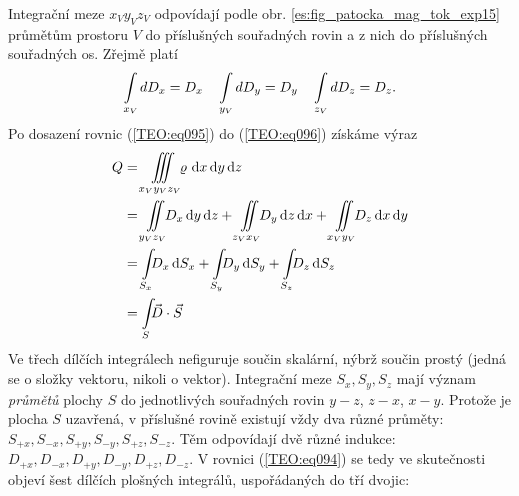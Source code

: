       Integrační meze \(x_Vy_Vz_V\) odpovídají podle obr. \ref{es:fig_patocka_mag_tok_exp15} 
      průmětům prostoru \(V\) do příslušných souřadných rovin a z nich do příslušných souřadných 
      os. Zřejmě platí
      \begin{equation}\label{TEO:eq095}
        \limitint_{\mathclap{x_V}}dD_x = D_x \quad
        \limitint_{\mathclap{y_V}}dD_y = D_y \quad
        \limitint_{\mathclap{z_V}}dD_z = D_z.
      \end{equation}
      Po dosazení rovnic (\ref{TEO:eq095}) do (\ref{TEO:eq096}) získáme výraz
      \begin{align}
        Q &= \iiint\limits_{x_Vy_Vz_V}\mspace{-9.0mu}\varrho\,\dd{x}\dd{y}\dd{z}  \nonumber\\ 
          &= \iint\limits_{y_Vz_V}\mspace{-9.0mu}D_x\dd{y}\dd{z} + 
             \iint\limits_{z_Vx_V}\mspace{-9.0mu}D_y\dd{z}\dd{x} + 
             \iint\limits_{x_Vy_V}\mspace{-9.0mu}D_z\dd{x}\dd{y}                  \nonumber\\ 
          &= \int\limits_{S_x}\mspace{-9.0mu}D_x\dd{S_x} + 
             \int\limits_{S_y}\mspace{-9.0mu}D_y\dd{S_y} + 
             \int\limits_{S_z}\mspace{-9.0mu}D_z\dd{S_z}                          \nonumber\\                 
          &= \int\limits_{S}\mspace{-9.0mu}\vec{D}\cdot\vec{S}                    \label{TEO:eq094}
      \end{align}
      Ve třech dílčích integrálech nefiguruje součin skalární, nýbrž součin prostý (jedná se o 
      složky vektoru, nikoli o vektor). Integrační meze \(S_x, S_y, S_z\) mají význam 
      \emph{průmětů} plochy \(S\) do jednotlivých souřadných rovin \(y-z\), \(z-x\), \(x-y\). 
      Protože je plocha \(S\) uzavřená, v příslušné rovině existují vždy dva různé průměty: 
      \(S_{+x}, S_{-x}, S_{+y}, S_{-y}, S_{+z}, S_{-z}\). Těm odpovídají dvě různé indukce: 
      \(D_{+x}, D_{-x}, D_{+y}, D_{-y}, D_{+z}, D_{-z}\). V rovnici (\ref{TEO:eq094}) se 
      tedy ve skutečnosti objeví šest dílčích plošných integrálů, uspořádaných do tří dvojic:
